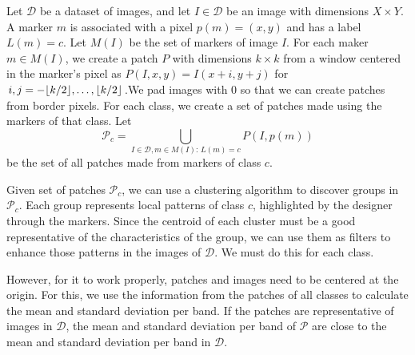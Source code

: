 \documentclass[a4paper,conference]{IEEEtran}
\DeclarePairedDelimiter\floor{\lfloor}{\rfloor}
\newcommand{\D}{\mathcal{D}}
\newcommand{\Pa}{\mathcal{P}}
\begin{document}
Let $\D$ be a dataset of images, and let $I \in \D$ be an image with dimensions $X \times Y$. A marker $m$ is associated with a pixel $p(m) = (x, y)$ and has a label $L(m) = c$. Let $M(I)$ be the set of markers of image $I$.  For each maker $m \in M(I)$, we create a patch $P$ with dimensions $k \times k$ from a window centered in the marker's pixel as $P(I, x ,y) = I(x+i, y+j)$ for $i, j = -\floor{k/2}, \ldots, \floor{k/2}$.We pad images with $0$ so that we can create patches from border pixels. For each class, we create a set of patches made using the markers of that class. Let \[\mathcal{P}_c = \bigcup_{ I \in \D, m \in M(I) :\, L(m) = c}{P(I, p(m))}\] be the set of all patches made from markers of class $c$.

Given set of patches $\Pa_c$, we can use a clustering algorithm to discover groups in $\Pa_c$. Each group represents local patterns of class $c$, highlighted by the designer through the markers. Since the centroid of each cluster must be a good representative of the characteristics of the group, we can use them as filters to enhance those patterns in the images of $\D$. We must do this for each class.

However, for it to work properly, patches and images need to be centered at the origin. For this, we use the information from the patches of all classes to calculate the mean and standard deviation per band. If the patches are representative of images in $\D$, the mean and standard deviation per band of $\Pa$ are close to the mean and standard deviation per band in $\D$.

\end{document}
